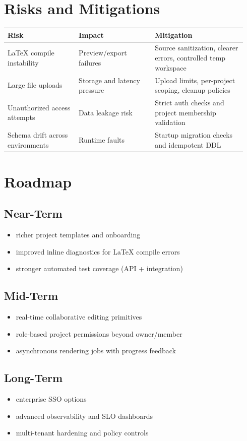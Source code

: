 \documentclass[11pt,a4paper]{article}
\begin{document}
\section{Risks and Mitigations}
\begin{longtable}{p{0.28\linewidth} p{0.30\linewidth} p{0.36\linewidth}}
\toprule
\textbf{Risk} & \textbf{Impact} & \textbf{Mitigation} \\
\midrule
LaTeX compile instability & Preview/export failures & Source sanitization, clearer errors, controlled temp workspace \\
Large file uploads & Storage and latency pressure & Upload limits, per-project scoping, cleanup policies \\
Unauthorized access attempts & Data leakage risk & Strict auth checks and project membership validation \\
Schema drift across environments & Runtime faults & Startup migration checks and idempotent DDL \\
\bottomrule
\end{longtable}

\section{Roadmap}
\subsection*{Near-Term}
\begin{itemize}[leftmargin=1.5em]
  \item richer project templates and onboarding
  \item improved inline diagnostics for LaTeX compile errors
  \item stronger automated test coverage (API + integration)
\end{itemize}

\subsection*{Mid-Term}
\begin{itemize}[leftmargin=1.5em]
  \item real-time collaborative editing primitives
  \item role-based project permissions beyond owner/member
  \item asynchronous rendering jobs with progress feedback
\end{itemize}

\subsection*{Long-Term}
\begin{itemize}[leftmargin=1.5em]
  \item enterprise SSO options
  \item advanced observability and SLO dashboards
  \item multi-tenant hardening and policy controls
\end{itemize}
\end{document}
